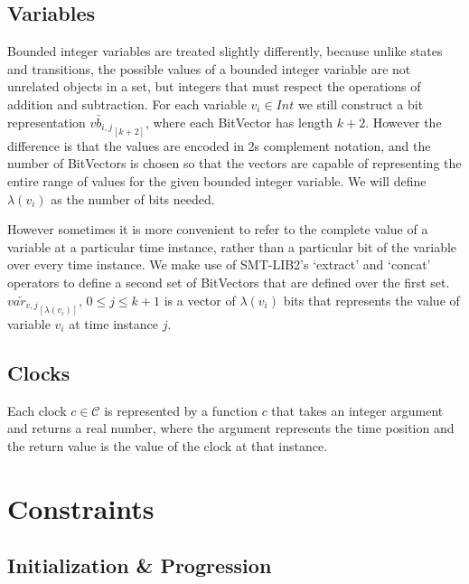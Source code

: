 \documentclass[a4paper,12pt]{article}
\newcommand*\BitAnd{\mathbin{\&}}
\newcommand*\BitOr{\mathbin{|}}
\begin{document}
\subsection{Variables}\label{encoding-variables}

Bounded integer variables are treated slightly differently, because unlike
states and transitions, the possible values of a bounded integer variable are
not unrelated objects in a set, but integers that must respect the operations of
addition and subtraction. For each variable \(v_i \in Int\) we still construct a
bit representation \(\overleftarrow{vb_{i,j}}_{[k+2]}\), where each BitVector
has length \(k+2\). However the difference is that the values are encoded in 2s
complement notation, and the number of BitVectors is chosen so that the vectors
are capable of representing the entire range of values for the given bounded
integer variable. We will define \(\lambda(v_i)\) as the number of bits needed.

However sometimes it is more convenient to refer to the complete value of a
variable at a particular time instance, rather than a particular bit of the
variable over every time instance. We make use of SMT-LIB2's `extract' and
`concat' operators to define a second set of BitVectors that are defined over
the first set. \(\overleftarrow{var_{v,j}}_{[\lambda(v_i)]}\), \(0 \leq j \leq
k+1\) is a vector of \(\lambda(v_i)\) bits that represents the value of variable
\(v_i\) at time instance \(j\).


\subsection{Clocks}\label{encoding-clocks}

Each clock \(c \in \mathcal{C}\) is represented by a function \(c\) that takes
an integer argument and returns a real number, where the argument represents the
time position and the return value is the value of the clock at that instance.

\section{Constraints}\label{constraints}
\iffalse
TODO:\@ mention that the operators \(\lor, \land, \BitOr , \BitAnd, \Rightarrow\) represent
bvor, bvand, etc. (in background) -  maybe explain how you are exploiting
bvlogic to write constraints - quick comment
\fi

\subsection{Initialization \& Progression}\label{constraints-init}
\end{document}
